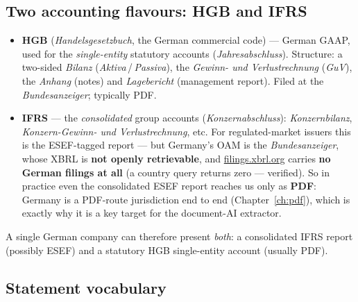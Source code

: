 \documentclass[11pt,a4paper]{report}
\begin{document}
\subsection{Two accounting flavours: HGB and IFRS}\label{sec:de-accounting-flavours}

\begin{itemize}
  \item \textbf{HGB} (\emph{Handelsgesetzbuch}, the German commercial code) --- German GAAP, used for the
    \emph{single-entity} statutory accounts (\emph{Jahresabschluss}). Structure: a two-sided \emph{Bilanz}
    (\emph{Aktiva}\,/\,\emph{Passiva}), the \emph{Gewinn- und Verlustrechnung} (\emph{GuV}), the
    \emph{Anhang} (notes) and \emph{Lagebericht} (management report). Filed at the \emph{Bundesanzeiger};
    typically PDF.
  \item \textbf{IFRS} --- the \emph{consolidated} group accounts (\emph{Konzernabschluss}):
    \emph{Konzernbilanz}, \emph{Konzern-Gewinn- und Verlustrechnung}, etc. For regulated-market issuers
    this is the ESEF-tagged report --- but Germany's OAM is the \emph{Bundesanzeiger}, whose XBRL is
    \textbf{not openly retrievable}, and \href{https://filings.xbrl.org}{filings.xbrl.org} carries
    \textbf{no German filings at all} (a country query returns zero --- verified). So in practice even the
    consolidated ESEF report reaches us only as \textbf{PDF}: Germany is a PDF-route jurisdiction end to
    end (Chapter~\ref{ch:pdf}), which is exactly why it is a key target for the document-AI extractor.
\end{itemize}

\noindent A single German company can therefore present \emph{both}: a consolidated IFRS report (possibly
ESEF) and a statutory HGB single-entity account (usually PDF).

\subsection{Statement vocabulary}
\end{document}

